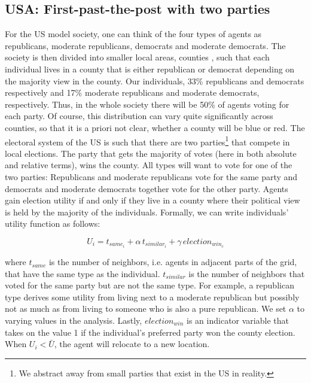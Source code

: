 \documentclass[12pt, a4paper]{article}
\begin{document}
\subsection{USA: First-past-the-post with two parties}
 For the US model society, one can think of the four types of agents as republicans, moderate republicans, democrats and moderate democrats. The society is then divided into smaller local areas, counties 
 , such that each individual lives in a county that is either republican or democrat depending on the majority view in the county. Our individuals, 33\% republicans and democrats respectively and 17\% moderate republicans and moderate democrats, respectively. %
 Thus, in the whole society there will be 50\% of agents voting for each party. Of course, this distribution can vary quite significantly across counties, so that it is a priori not clear, whether a county will be blue or red.
 The electoral system of the US is such that there are two parties\footnote{We abstract away from small parties that exist in the US in reality.} that compete in local elections. The party that gets the majority of votes (here in both absolute and relative terms), wins the county. All types will want to vote for one of the two parties: Republicans and moderate republicans vote for the same party and democrats and moderate democrats together vote for the other party. Agents gain election utility if and only if they live in a county where their political view is held by the majority of the individuals.  Formally, we can write individuals' utility function as follows:
  
  
 \begin{equation}
 U_i=t_{same_i}+\alpha \, t_{similar_i}+\gamma \, election_{win_c}
 \end{equation}
 
 where $t_{same}$ is the number of neighbors, i.e. agents in adjacent parts of the grid, that have the same type as the individual. $t_{similar}$ is the number of neighbors that voted for the same party but are not the same type. For example, a republican type derives some utility from living next to a moderate republican but possibly not as much as from living to someone who is also a pure republican. We set $\alpha$ to varying values in the analysis. Lastly, $election_{win}$ is an indicator variable that takes on the value 1 if the individual's preferred party won the county election. When $U_i < \bar{U}$, the agent will relocate to a new location.
 
\end{document}
